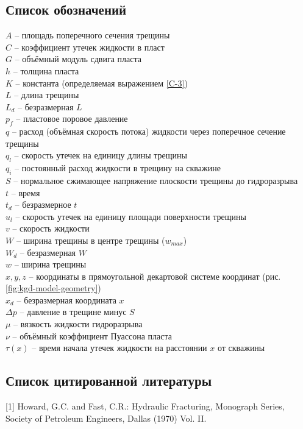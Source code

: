 \documentclass[a4paper, 12pt]{article}
\begin{document}
\subsection{Список обозначений}
\setlength{\parindent}{0pt}
$A$ -- площадь поперечного сечения трещины\\
$C$ -- коэффициент утечек жидкости в пласт\\
$G$ -- объёмный модуль сдвига пласта\\
$h$ -- толщина пласта\\
$K$ -- константа (определяемая выражением \eqref{C-3})\\
$L$ -- длина трещины\\
$L_d$ -- безразмерная $L$\\
$p_f$ -- пластовое поровое давление\\
$q$ -- расход (объёмная скорость потока) жидкости через поперечное сечение трещины\\
$q_l$ -- скорость утечек на единицу длины трещины\\
$q_i$ -- постоянный расход жидкости в трещину на скважине\\
$S$ -- нормальное сжимающее напряжение плоскости трещины до гидроразрыва\\
$t$ -- время\\
$t_d$ -- безразмерное $t$\\
$u_l$ -- скорость утечек на единицу площади поверхности трещины\\
$v$ -- скорость жидкости\\
$W$ -- ширина трещины в центре трещины ($w_{max}$)\\
$W_d$ -- безразмерная $W$\\
$w$ -- ширина трещины\\
$x,y,z$ -- координаты в прямоугольной декартовой системе координат (рис. \ref{fig:kgd-model-geometry})\\
$x_d$ -- безразмерная координата $x$\\
$\Delta p$ -- давление в трещине минус $S$\\
$\mu$ -- вязкость жидкости гидроразрыва\\
$\nu$ -- объёмный коэффициент Пуассона пласта\\
$\tau(x)$ -- время начала утечек жидкости на расстоянии $x$ от скважины
\setlength{\parindent}{20pt}

\subsection{Список цитированной литературы}
\setlength{\parindent}{0pt}
[1] Howard, G.C. and Fast, C.R.: Hydraulic Fracturing, Monograph Series, Society of Petroleum Engineers, Dallas (1970) Vol. II.
\end{document}
